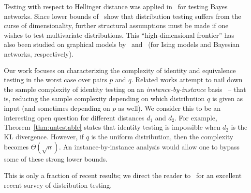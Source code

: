 Testing with respect to Hellinger distance was applied in~\cite{DaskalakisP17} for testing Bayes networks.
Since lower bounds of~\cite{AcharyaDK15} show that distribution testing suffers from the curse of dimensionality, further structural assumptions must be made if one wishes to test multivariate distributions.
This ``high-dimensional frontier'' has also been studied on graphical models by~\cite{DaskalakisDK18} and~\cite{CanonneDKS17} (for Ising models and Bayesian networks, respectively).

Our work focuses on characterizing the complexity of identity and equivalence testing in the worst case over pairs $p$ and $q$.
Related works attempt to nail down the sample complexity of identity testing on an \emph{instance-by-instance} basis~\cite{ValiantV17, JiaoHW16, DiakonikolasK16, BlaisCG17} -- that is, reducing the sample complexity depending on which distribution $q$ is given as input (and sometimes depending on $p$ as well).
We consider this to be an interesting open question for different distances $d_1$ and $d_2$.
For example, Theorem~\ref{thm:untestable} states that identity testing is impossible when $d_2$ is the KL divergence.
However, if $q$ is the uniform distribution, then the complexity becomes $\Theta(\sqrt{n})$.
An instance-by-instance analysis would allow one to bypass some of these strong lower bounds.

This is only a fraction of recent results; we direct the reader to~\cite{Canonne15} for an excellent recent survey of distribution testing.

